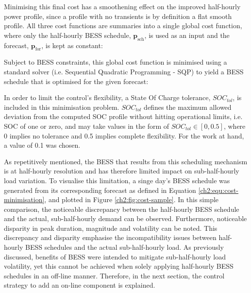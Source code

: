 


Minimising this final cost has a smoothening effect on the improved half-hourly power profile, since a profile with no transients is by definition a flat smooth profile.
All three cost functions are summaries into a single global cost function, where only the half-hourly BESS schedule, $\textbf{p}_\text{sch}$, is used as an input and the forecast, $\textbf{p}_\text{for}$, is kept as constant:



Subject to BESS constraints, this global cost function is minimised using a standard solver (i.e. Sequential Quadratic Programming - SQP) to yield a BESS schedule that is optimised for the given forecast:



In order to limit the control's flexibility, a State Of Charge tolerance, $SOC_{tol}$, is included in this minimisation problem.
$SOC_{tol}$ defines the maximum allowed deviation from the computed SOC profile without hitting operational limits, i.e. SOC of one or zero, and may take values in the form of $SOC_{tol} \in [0, 0.5]$, where 0 implies no tolerance and 0.5 implies complete flexibility.
For the work at hand, a value of 0.1 was chosen.



As repetitively mentioned, the BESS that results from this scheduling mechanism is at half-hourly resolution and has therefore limited impact on sub-half-hourly load variation.
To visualise this limitation, a singe day's BESS schedule was generated from its corresponding forecast as defined in Equation \ref{ch2:equ:cost-minimisation}, and plotted in Figure \ref{ch2:fig:cost-sample}.
In this simple comparison, the noticeable discrepancy between the half-hourly BESS schedule and the actual, sub-half-hourly demand can be observed.
Furthermore, noticeable disparity in peak duration, magnitude and volatility can be noted.
This discrepancy and disparity emphasise the incompatibility issues between half-hourly BESS schedules and the actual sub-half-hourly load.
As previously discussed, benefits of BESS were intended to mitigate sub-half-hourly load volatility, yet this cannot be achieved when solely applying half-hourly BESS schedules in an off-line manner.
Therefore, in the next section, the control strategy to add an on-line component is explained.




 